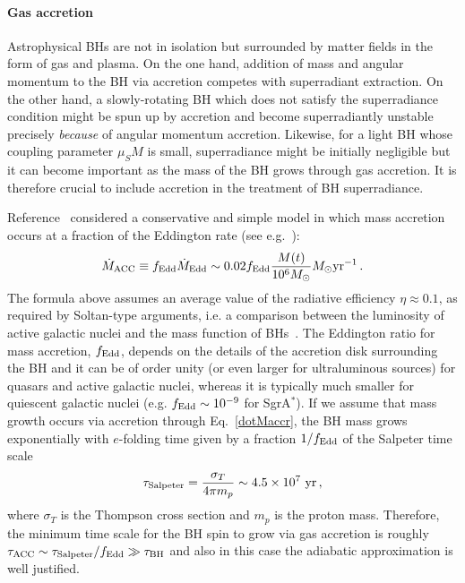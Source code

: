 \documentclass[11pt]{article}
\numberwithin{equation}{section} %
\begin{document}
\paragraph{Gas accretion}
Astrophysical BHs are not in isolation but surrounded by matter fields in the form of gas and plasma. On the one hand, addition of mass and angular momentum to the BH via accretion competes with superradiant extraction. On the other hand, a slowly-rotating BH which does not satisfy the superradiance condition might be spun up by accretion and become superradiantly unstable precisely \emph{because} of angular momentum accretion. Likewise, for a light BH whose coupling parameter $\mu_S M$ is small, superradiance might be initially negligible but it can become important as the mass of the BH grows through gas accretion. It is therefore crucial to include accretion in the treatment of BH superradiance.

Reference~\cite{Brito:2014wla} considered a conservative and simple model in which mass accretion occurs at a fraction of the Eddington rate (see e.g.~\cite{Barausse:2014tra}):
%
\begin{equation}
 \dot M_{\rm ACC} \equiv f_{\rm Edd} \dot M_{\rm Edd}\sim 0.02 f_{\rm Edd} \frac{M(t)}{10^6 M_\odot} M_\odot {\rm yr}^{-1}\,.\label{dotMaccr}
\end{equation}
The formula above assumes an average value of the radiative efficiency $\eta\approx0.1$, as required by Soltan-type arguments, i.e. a comparison between the luminosity of active galactic nuclei and the mass function of BHs~\cite{LyndenBell:1969yx,Soltan:1982vf}. The Eddington ratio for mass accretion, $f_{\rm Edd}$, depends on the details of the accretion disk surrounding the BH and it can be of order unity (or even larger for ultraluminous sources) for quasars and active galactic nuclei, whereas it is typically much smaller for quiescent galactic nuclei (e.g. $f_{\rm Edd}\sim 10^{-9}$ for SgrA$^{*}$). If we assume that mass growth occurs via accretion through Eq.~\eqref{dotMaccr}, the
BH mass grows exponentially with $e$-folding time given by a fraction $1/f_{\rm Edd}$ of the Salpeter time scale
\begin{equation}
 \tau_{\rm Salpeter}=\frac{\sigma_T}{4\pi m_p}\sim4.5\times 10^7~{\rm yr}\,, \label{Salpeter}
\end{equation}
where $\sigma_T$ is the Thompson cross section and $m_p$ is the proton mass. Therefore, the minimum time scale for the BH spin to grow via gas accretion is roughly $\tau_{\rm ACC}\sim \tau_{\rm Salpeter}/f_{\rm Edd}\gg \tau_{\rm BH}$ and also in this case the adiabatic approximation is well justified.
\end{document}
